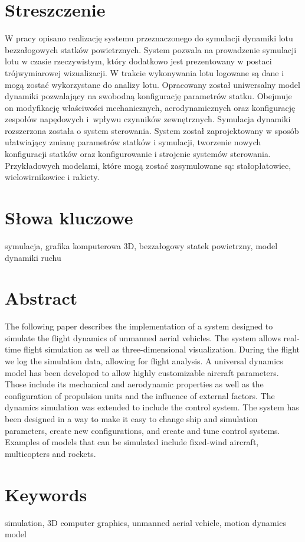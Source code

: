 \section*{Streszczenie}
W pracy opisano realizację systemu przeznaczonego do symulacji dynamiki lotu bezzałogowych statków powietrznych. System pozwala na prowadzenie symulacji lotu w czasie rzeczywistym, który dodatkowo jest prezentowany w postaci trójwymiarowej wizualizacji. W trakcie wykonywania lotu logowane są dane i mogą zostać wykorzystane do analizy lotu. Opracowany został uniwersalny model dynamiki pozwalający na swobodną konfigurację parametrów statku. Obejmuje on modyfikację właściwości mechanicznych, aerodynamicznych oraz konfigurację zespołów napędowych i~wpływu czynników zewnętrznych. Symulacja dynamiki rozszerzona została o system sterowania. System został zaprojektowany w sposób ułatwiający zmianę parametrów statków i symulacji, tworzenie nowych konfiguracji statków oraz konfigurowanie i strojenie systemów sterowania. Przykładowych modelami, które mogą zostać zasymulowane są: stałopłatowiec, wielowirnikowiec i rakiety.

\section*{Słowa kluczowe}

symulacja, grafika komputerowa 3D, bezzałogowy statek powietrzny, model dynamiki ruchu

\newpage

\section*{Abstract}

The following paper describes the implementation of a system designed to simulate the flight dynamics of unmanned aerial vehicles. The system allows real-time flight simulation as well as three-dimensional visualization. During the flight we log the simulation data, allowing for flight analysis. A universal dynamics model has been developed to allow highly customizable aircraft parameters. Those include its mechanical and aerodynamic properties as well as the configuration of propulsion units and the influence of external factors. The dynamics simulation was extended to include the control system. The system has been designed in a way to make it easy to change ship and simulation parameters, create new configurations, and create and tune control systems. Examples of models that can be simulated include fixed-wind aircraft, multicopters and rockets.

\section*{Keywords}

simulation, 3D computer graphics, unmanned aerial vehicle, motion dynamics model

\newpage
\tableofcontents
